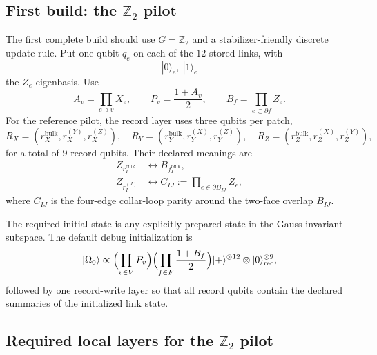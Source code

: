 \documentclass[11pt]{article}
\begin{document}
\subsection{First build: the $\mathbb Z_2$ pilot}

The first complete build should use $G=\mathbb Z_2$ and a stabilizer-friendly discrete update
rule. Put one qubit $q_e$ on each of the $12$ stored links, with
\begin{equation}
|0\rangle_e,\ |1\rangle_e
\end{equation}
the $Z_e$-eigenbasis. Use
\begin{equation}
A_v=\prod_{e\ni v}X_e,
\qquad
P_v=\frac{1+A_v}{2},
\qquad
B_f=\prod_{e\subset\partial f}Z_e.
\end{equation}
For the reference pilot, the record layer uses three qubits per patch,
\begin{equation}
R_X=(r_X^{\mathrm{bulk}},r_X^{(Y)},r_X^{(Z)}),\quad
R_Y=(r_Y^{\mathrm{bulk}},r_Y^{(X)},r_Y^{(Z)}),\quad
R_Z=(r_Z^{\mathrm{bulk}},r_Z^{(X)},r_Z^{(Y)}),
\end{equation}
for a total of $9$ record qubits. Their declared meanings are
\begin{align}
Z_{r_I^{\mathrm{bulk}}} &\leftrightarrow B_{f_I^{\mathrm{bulk}}},\\
Z_{r_I^{(J)}} &\leftrightarrow C_{IJ}:=\prod_{e\in \partial B_{IJ}} Z_e,
\end{align}
where $C_{IJ}$ is the four-edge collar-loop parity around the two-face overlap $B_{IJ}$.

The required initial state is any explicitly prepared state in the Gauss-invariant subspace. The
default debug initialization is
\begin{equation}
|\Omega_0\rangle \propto
\Bigl(\prod_{v\in V}P_v\Bigr)
\Bigl(\prod_{f\in F}\frac{1+B_f}{2}\Bigr)
|+\rangle^{\otimes 12}\otimes |0\rangle_{\mathrm{rec}}^{\otimes 9},
\end{equation}
followed by one record-write layer so that all record qubits contain the declared summaries of
the initialized link state.

\subsection{Required local layers for the $\mathbb Z_2$ pilot}
\end{document}
